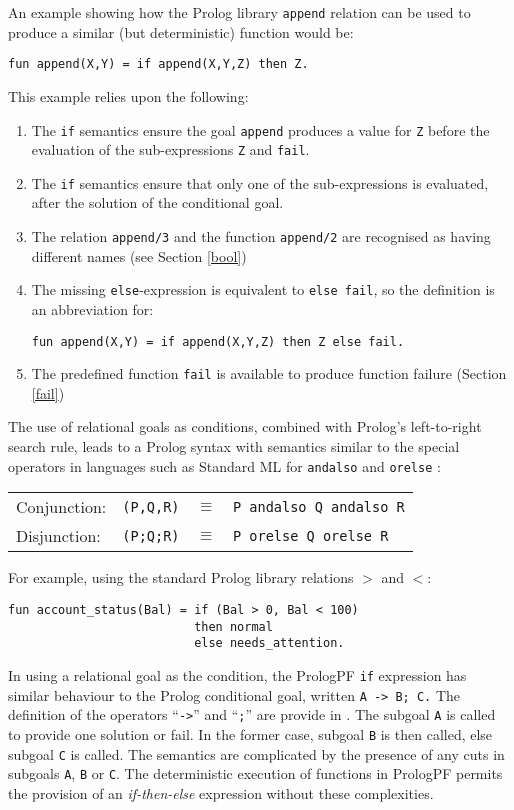 An example showing how the Prolog library \texttt{append} relation can
be used to produce a similar (but deterministic) function would be:
\begin{verbatim}
fun append(X,Y) = if append(X,Y,Z) then Z.
\end{verbatim}
This example relies upon the following:
\begin{enumerate}
\item{The \texttt{if} semantics ensure the goal \texttt{append} produces a
  value for \texttt{Z} before the evaluation of the sub-expressions
  \texttt{Z} and \texttt{fail}.}
\item{The \texttt{if} semantics ensure that
  only one of the sub-expressions is
  evaluated, after the
  solution of the conditional goal.}
\item{The relation \texttt{append/3} and the function \texttt{append/2} are recognised
  as having different names (see Section \ref{bool})}
\item{The missing \texttt{else}-expression is equivalent to \texttt{else fail}, so the
  definition is an abbreviation for:\\
  \centerline{\texttt{fun append(X,Y) = if append(X,Y,Z) then Z else fail.}}
  }
\item{The predefined function \texttt{fail} is available to produce
  function failure (Section \ref{fail})}
\end{enumerate}

The use of relational goals as conditions, combined with Prolog's left-to-right
search rule,
leads to a Prolog syntax with semantics similar to the special operators in languages
such as Standard ML for \texttt{andalso} and \texttt{orelse} \cite{MTH90}:

\begin{tabular}{l l l l}
Conjunction: & \texttt{(P,Q,R)} & $\equiv$ & \texttt{P andalso Q andalso R}\\
Disjunction: & \texttt{(P;Q;R)} & $\equiv$ & \texttt{P orelse Q orelse R}
\end{tabular}

For example, using the standard Prolog library relations $>$ and $<$:
\begin{verbatim}
fun account_status(Bal) = if (Bal > 0, Bal < 100)
                          then normal
                          else needs_attention.
\end{verbatim}
In using a relational goal as the condition, the PrologPF \texttt{if} expression 
has similar behaviour to the Prolog conditional goal, written \texttt{A -> B; C.}
The definition of the operators ``\texttt{->}'' and ``\texttt{;}'' are provide in
\cite{DEDC96}.  The subgoal \texttt{A} is called to provide one solution or fail.
In the former case, subgoal \texttt{B} is then called, else subgoal \texttt{C} is
called.  The semantics are complicated by the presence of any cuts in subgoals
\texttt{A}, \texttt{B} or \texttt{C}.  The deterministic execution of functions in
PrologPF permits the provision of an \textit{if-then-else} expression without these
complexities.

